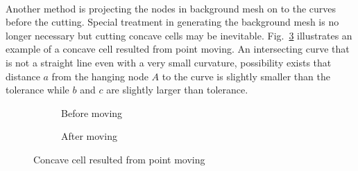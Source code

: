 \paragraph{}
Another method is projecting the nodes in background mesh on to the curves before the cutting.
Special treatment in generating the background mesh is no longer necessary but cutting concave cells may be inevitable.
Fig.~\ref{qdt_fig:qdt_cutting_point_moving_2_concave} illustrates an example of a concave cell resulted from point moving.
An intersecting curve that is not a straight line even with a very small curvature, possibility exists that distance $a$ from the hanging node $A$ to the curve is slightly smaller than the tolerance while $b$ and $c$ are slightly larger than tolerance.
    \begin{figure}[h!]
        \begin{subfigure}[b]{0.5\linewidth}
            \centering
            \caption{Before moving}
            \label{qdt_fig:qdt_cutting_point_moving_2_concave_before}
        \end{subfigure}
        \begin{subfigure}[b]{0.5\linewidth}
            \centering
            \caption{After moving}
            \label{qdt_fig:qdt_cutting_point_moving_2_concave_after}
        \end{subfigure}
        \caption[Concave cell resulted from points moving]{Concave cell resulted from point moving}
        \label{qdt_fig:qdt_cutting_point_moving_2_concave}
    \end{figure}

